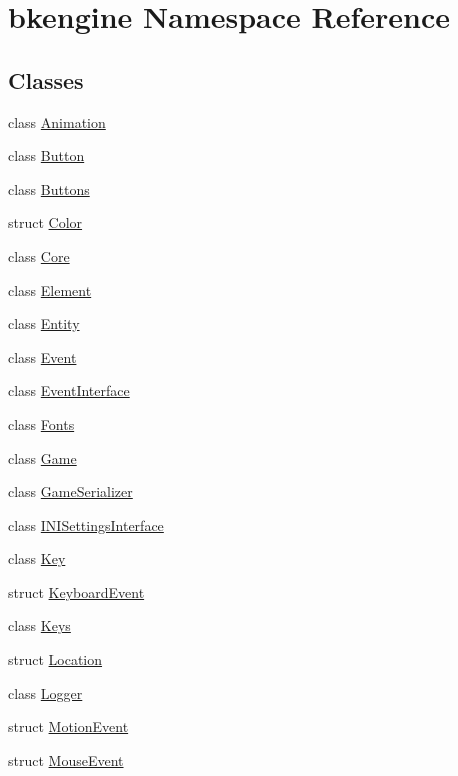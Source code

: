 \hypertarget{namespacebkengine}{}\section{bkengine Namespace Reference}
\label{namespacebkengine}
\subsection*{Classes}
\begin{DoxyCompactItemize}
\item 
class \hyperlink{classbkengine_1_1Animation}{Animation}
\item 
class \hyperlink{classbkengine_1_1Button}{Button}
\item 
class \hyperlink{classbkengine_1_1Buttons}{Buttons}
\item 
struct \hyperlink{structbkengine_1_1Color}{Color}
\item 
class \hyperlink{classbkengine_1_1Core}{Core}
\item 
class \hyperlink{classbkengine_1_1Element}{Element}
\item 
class \hyperlink{classbkengine_1_1Entity}{Entity}
\item 
class \hyperlink{classbkengine_1_1Event}{Event}
\item 
class \hyperlink{classbkengine_1_1EventInterface}{Event\+Interface}
\item 
class \hyperlink{classbkengine_1_1Fonts}{Fonts}
\item 
class \hyperlink{classbkengine_1_1Game}{Game}
\item 
class \hyperlink{classbkengine_1_1GameSerializer}{Game\+Serializer}
\item 
class \hyperlink{classbkengine_1_1INISettingsInterface}{I\+N\+I\+Settings\+Interface}
\item 
class \hyperlink{classbkengine_1_1Key}{Key}
\item 
struct \hyperlink{structbkengine_1_1KeyboardEvent}{Keyboard\+Event}
\item 
class \hyperlink{classbkengine_1_1Keys}{Keys}
\item 
struct \hyperlink{structbkengine_1_1Location}{Location}
\item 
class \hyperlink{classbkengine_1_1Logger}{Logger}
\item 
struct \hyperlink{structbkengine_1_1MotionEvent}{Motion\+Event}
\item 
struct \hyperlink{structbkengine_1_1MouseEvent}{Mouse\+Event}
\item 

\end{DoxyCompactItemize}
